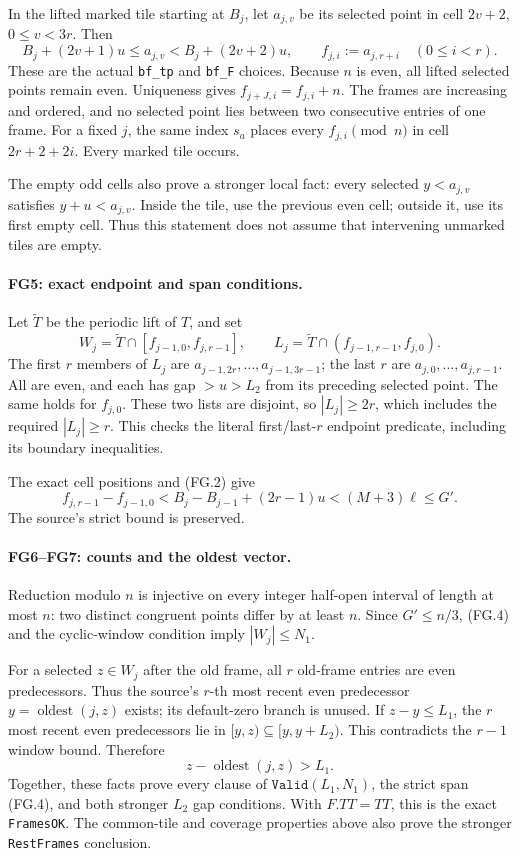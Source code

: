 In the lifted marked tile starting at $B_j$, let $a_{j,v}$ be its
selected point in cell $2v+2$, $0\le v<3r$. Then
\[
 B_j+(2v+1)u\le a_{j,v}<B_j+(2v+2)u,\qquad
 f_{j,i}:=a_{j,r+i}\quad(0\le i<r).                    \tag{FG.3}
\]
These are the actual \texttt{bf\_tp} and \texttt{bf\_F} choices.
Because $n$ is even, all lifted selected points remain even.
Uniqueness gives $f_{j+J,i}=f_{j,i}+n$.
The frames are increasing and ordered, and no selected point lies
between two consecutive entries of one frame. For a fixed $j$,
the same index $s_a$ places every $f_{j,i}\pmod n$ in cell
$2r+2+2i$. Every marked tile occurs.

The empty odd cells also prove a stronger local fact: every selected
$y<a_{j,v}$ satisfies $y+u<a_{j,v}$. Inside the tile, use the previous
even cell; outside it, use its first empty cell. Thus this statement
does not assume that intervening unmarked tiles are empty.

\paragraph{FG5: exact endpoint and span conditions.}
Let $\widetilde T$ be the periodic lift of $T$, and set
\[
 W_j=\widetilde T\cap[f_{j-1,0},f_{j,r-1}],\qquad
 L_j=\widetilde T\cap(f_{j-1,r-1},f_{j,0}).
\]
The first $r$ members of $L_j$ are $a_{j-1,2r},\ldots,a_{j-1,3r-1}$;
the last $r$ are $a_{j,0},\ldots,a_{j,r-1}$.
All are even, and each has gap $>u>L_2$ from its preceding selected
point. The same holds for $f_{j,0}$. These two lists are disjoint,
so $|L_j|\ge2r$, which includes the required $|L_j|\ge r$.
This checks the literal first/last-$r$ endpoint predicate, including
its boundary inequalities.

The exact cell positions and (FG.2) give
\[
 f_{j,r-1}-f_{j-1,0}
 <B_j-B_{j-1}+(2r-1)u
 <(M+3)\ell\le G'.                                    \tag{FG.4}
\]
The source's strict bound is preserved.

\paragraph{FG6--FG7: counts and the oldest vector.}
Reduction modulo $n$ is injective on every integer half-open interval
of length at most $n$: two distinct congruent points differ by at
least $n$. Since $G'\le n/3$, (FG.4) and the cyclic-window condition imply
$|W_j|\le N_1$.

For a selected $z\in W_j$ after the old frame, all $r$ old-frame
entries are even predecessors. Thus the source's $r$-th most recent
even predecessor $y=\operatorname{oldest}(j,z)$ exists; its
default-zero branch is unused. If $z-y\le L_1$, the $r$ most recent
even predecessors lie in $[y,z)\subseteq[y,y+L_2)$.
This contradicts the $r-1$ window bound. Therefore
\[
 z-\operatorname{oldest}(j,z)>L_1.                    \tag{FG.5}
\]
Together, these facts prove every clause of
$\texttt{Valid}(L_1,N_1)$, the strict span (FG.4), and both stronger
$L_2$ gap conditions. With $F.TT=TT$, this is the exact
\texttt{FramesOK}. The common-tile and coverage properties above also
prove the stronger \texttt{RestFrames} conclusion.

